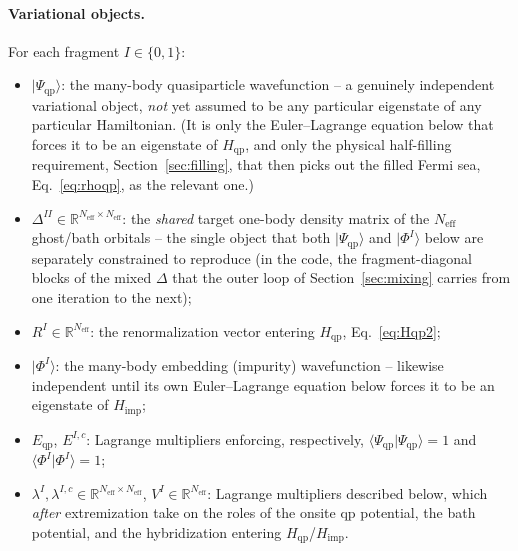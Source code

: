 \documentclass[11pt]{article}
\newcommand{\Neff}{N_{\mathrm{eff}}}
\newcommand{\Hqp}{H_{\mathrm{qp}}}
\newcommand{\Himp}{H_{\mathrm{imp}}}
\begin{document}
\paragraph{Variational objects.} For each fragment $I\in\{0,1\}$:
\begin{itemize}
  \item $|\Psi_{\mathrm{qp}}\rangle$: the many-body quasiparticle
    wavefunction -- a genuinely independent variational object, \emph{not}
    yet assumed to be any particular eigenstate of any particular
    Hamiltonian. (It is only the Euler--Lagrange equation below that forces
    it to be an eigenstate of $\Hqp$, and only the physical half-filling
    requirement, Section~\ref{sec:filling}, that then picks out the filled
    Fermi sea, Eq.~\eqref{eq:rhoqp}, as the relevant one.)
  \item $\Delta^{II}\in\mathbb R^{\Neff\times\Neff}$: the \emph{shared} target
    one-body density matrix of the $\Neff$ ghost/bath orbitals -- the single
    object that both $|\Psi_{\mathrm{qp}}\rangle$ and $|\Phi^I\rangle$ below
    are separately constrained to reproduce (in the code, the
    fragment-diagonal blocks of the mixed $\Delta$ that the outer loop of
    Section~\ref{sec:mixing} carries from one iteration to the next);
  \item $R^I\in\mathbb R^{\Neff}$: the renormalization vector entering
    $\Hqp$, Eq.~\eqref{eq:Hqp2};
  \item $|\Phi^I\rangle$: the many-body embedding (impurity) wavefunction --
    likewise independent until its own Euler--Lagrange equation below forces
    it to be an eigenstate of $\Himp$;
  \item $E_{\mathrm{qp}}$, $E^{I,c}$: Lagrange multipliers enforcing,
    respectively, $\langle\Psi_{\mathrm{qp}}|\Psi_{\mathrm{qp}}\rangle=1$ and
    $\langle\Phi^I|\Phi^I\rangle=1$;
  \item $\lambda^I,\lambda^{I,c}\in\mathbb R^{\Neff\times\Neff}$,
    $V^I\in\mathbb R^{\Neff}$: Lagrange multipliers described below, which
    \emph{after} extremization take on the roles of the onsite qp potential,
    the bath potential, and the hybridization entering $\Hqp$/$\Himp$.
\end{itemize}
\end{document}
